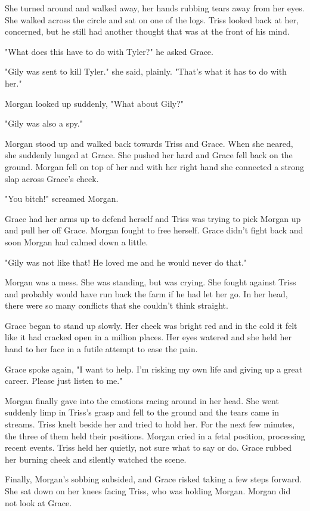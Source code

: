 \documentclass[courier]{sffms}
\begin{document}
She turned around and walked away, her
hands rubbing tears away from her eyes.
She walked across the circle and sat on one
of the logs. Triss looked back at her, concerned,
but he still had another thought
that was at the front
of his mind.

"What does this have to do with Tyler?" he asked
Grace.

"Gily was sent to kill Tyler." she said, plainly.
"That's what it has to do with her."

Morgan looked up suddenly, "What about Gily?"

"Gily was also a spy."

Morgan stood up and walked back towards
Triss and Grace. When she neared, she suddenly lunged
at Grace. She pushed her hard and Grace fell back on
the ground. Morgan fell on top of her and with her right
hand she connected a strong slap across Grace's cheek.

"You bitch!" screamed Morgan.

Grace had her arms up to defend herself and Triss
was trying to pick Morgan up and pull her off Grace.
Morgan fought to free herself. Grace didn't fight
back and soon Morgan had calmed down a little.

"Gily was not like that! He loved me and he would
never do that."

Morgan was a mess. She was standing, but was
crying. She fought against Triss and probably
would have run back the farm if he had let
her go. In her head, there were so many conflicts
that she couldn't think straight.

Grace began to stand up slowly. Her cheek was
bright red and in the cold it felt like it had cracked
open in a million places. Her eyes watered and 
she held her hand to her face in a futile attempt
to ease the pain.

Grace spoke again, "I want to help. I'm risking
my own life and giving up a great career. Please
just listen to me."

Morgan finally gave into the emotions racing around
in her head. She went suddenly limp in Triss's grasp
and fell to the ground and the tears came in streams.
Triss knelt beside her and tried to hold her. For the
next few minutes, the three of them held their
positions. Morgan cried in a fetal position, processing
recent events. Triss held her quietly, not sure what
to say or do. Grace rubbed her burning cheek and
silently watched the scene.

Finally, Morgan's sobbing subsided, and Grace
risked taking a few steps forward. She sat down
on her knees facing Triss, who was holding Morgan.
Morgan did not look at Grace.
\end{document}
